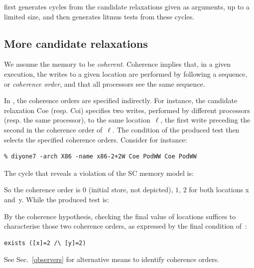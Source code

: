 \diy{} first generates cycles from the candidate relaxations
given as arguments, up to a limited size, and then generates
litmus tests from these cycles.

\subsection{More candidate relaxations}

We assume the memory to be \emph{coherent}.
Coherence implies that, in a given execution,
the writes to a given location are performed by following a sequence,
or \emph{coherence order},
and that all processors see the same sequence.


\label{sec:ws}In \diy{}, the coherence orders are specified indirectly.
For instance, the candidate relaxation Coe (resp. Coi) specifies two writes,
performed by different processors (resp. the same processor),
to the same location~$\ell$, the first write preceding the second in
the coherence order of~$\ell$.
The condition of the produced test then selects the specified coherence orders.
Consider for instance:
\begin{verbatim}
% diyone7 -arch X86 -name x86-2+2W Coe PodWW Coe PodWW
\end{verbatim}
The cycle that reveals a violation of the SC memory model is:
\begin{center}
\end{center}
So the coherence order is $0$ (initial store, not depicted),
$1$, $2$ for both locations x and~y.
While the produced test is:

By the coherence hypothesis, checking the final
value of locations suffices to characterise those two coherence orders,
as expressed by the final condition of~:
\begin{verbatim}
exists ([x]=2 /\ [y]=2)
\end{verbatim}
See Sec.~\ref{observers} for alternative means
to identify coherence orders.

